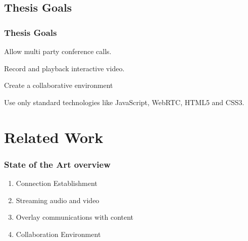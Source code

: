 \documentclass[compress]{beamer}
\begin{document}
		
	

	\subsection{Thesis Goals} %
  		\begin{frame}[c]
		\frametitle{Thesis Goals}
		Allow multi party conference calls.

		\vfill
		
		Record and playback interactive video.
		
		\vfill

        Create a collaborative environment        

        \vfill

		Use only standard technologies like JavaScript, WebRTC, HTML5 and CSS3.


		\end{frame}


\section{Related Work}\label{related}

	\begin{frame}[c]
			\frametitle{State of the Art overview}
	\begin{enumerate}
		\item Connection Establishment
		\item Streaming audio and video
		\item Overlay communications with content
		\item Collaboration Environment
	\end{enumerate}


	\end{frame}
\end{document}
